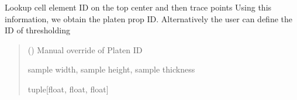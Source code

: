 \documentclass[letterpaper,10pt,english]{sphinxmanual}
\begin{document}
\begin{fulllineitems}
\begin{fulllineitems}
\begin{quote}
\begin{description}
\end{description}\end{quote}

\end{fulllineitems}


\begin{fulllineitems}
\label{\detokenize{openfdem:openfdem.openfdem.Model.rock_sample_dimensions}}
\pysigstartsignatures
{}
\pysigstopsignatures
\sphinxAtStartPar
Lookup cell element ID on the top center and then trace points Using this information, we obtain the platen prop ID.
Alternatively the user can define the ID of thresholding
\begin{quote}\begin{description}
\sphinxAtStartPar
{} () \textendash{} Manual override of Platen ID

\sphinxAtStartPar
sample width, sample height, sample thickness

\sphinxAtStartPar
tuple{[}float, float, float{]}


\end{description}
\end{quote}
\end{fulllineitems}
\end{fulllineitems}
\end{document}
